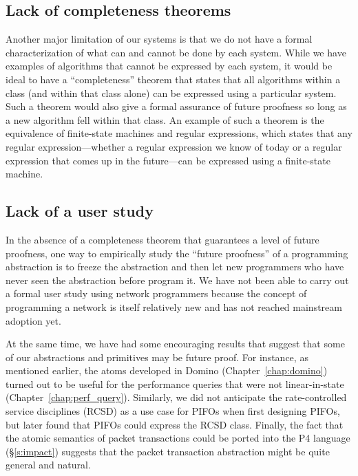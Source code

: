 \subsection{Lack of completeness theorems}
\label{ss:limit_completeness}

Another major limitation of our systems is that we do not have a formal
characterization of what can and cannot be done by each system. While we have
examples of algorithms that cannot be expressed by each system, it would be
ideal to have a ``completeness'' theorem that states that all algorithms within
a class (and within that class alone) can be expressed using a particular
system. Such a theorem would also give a formal assurance of future proofness
so long as a new algorithm fell within that class. An example of such a theorem
is the equivalence of finite-state machines and regular expressions, which
states that any regular expression---whether a regular expression we know of
today or a regular expression that comes up in the future---can be expressed
using a finite-state machine.

\subsection{Lack of a user study} In the absence of a completeness theorem that
guarantees a level of future proofness, one way to empirically study the
``future proofness'' of a programming abstraction is to freeze the abstraction
and then let new programmers who have never seen the abstraction before program
it. We have not been able to carry out a formal user study using network
programmers because the concept of programming a network is itself relatively
new and has not reached mainstream adoption yet.

At the same time, we have had some encouraging results that suggest that some
of our abstractions and primitives may be future proof. For instance, as
mentioned earlier, the atoms developed in Domino (Chapter~\ref{chap:domino})
turned out to be useful for the performance queries that were not
linear-in-state (Chapter~\ref{chap:perf_query}). Similarly, we did not
anticipate the rate-controlled service disciplines (RCSD) as a use case for
PIFOs when first designing PIFOs, but later found that PIFOs could express the
RCSD class. Finally, the fact that the atomic semantics of  packet transactions
could be ported into the P4 language (\S\ref{s:impact}) suggests that the
packet transaction abstraction might be quite general and natural.

